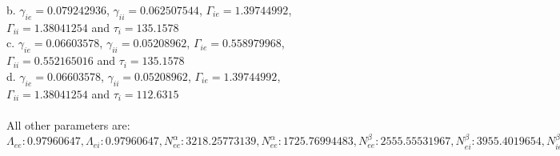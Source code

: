 \documentclass[a4paper,12pt]{article}
\begin{document}
\begin{figure}
{b. $\gamma_{ie} = 0.079242936$, $\gamma_{ii} = 0.062507544$, $\Gamma_{ie} = 1.39744992$, $\Gamma_{ii} = 1.38041254$ and $\tau_i = 135.1578$ \\
c. $\gamma_{ie} = 0.06603578$, $\gamma_{ii} = 0.05208962$, $\Gamma_{ie} = 0.558979968$, $\Gamma_{ii} = 0.552165016$ and $\tau_i = 135.1578$ \\
d. $\gamma_{ie} = 0.06603578$, $\gamma_{ii} = 0.05208962$, $\Gamma_{ie} = 1.39744992$, $\Gamma_{ii} = 1.38041254$ and $\tau_i = 112.6315$ \\
\\
All other parameters are:\\
$\Lambda_{ee}: 0.97960647, \Lambda_{ei}: 0.97960647, N^{\alpha}_{ee}: 3218.25773139, N^{\alpha}_{ee}: 1725.76994483,
N^{\beta}_{ee}: 2555.55531967, N^{\beta}_{ei}: 3955.4019654, N^{\beta}_{ie}: 558.83565101, N^{\beta}_{ii}: 805.76418084,
\Gamma_{ee}: 0.15172837, \Gamma_{ei}: 0.27123796, 
g: 0.7, \gamma_{ee}: 0.31475255879, \gamma_{ei}: 0.24594817, h^{rest}_e: -66.96584987, h^{eq}_{ee}: 0.0353266, h^{eq}_{ei}: -6.84352222,
h^{rest}_i: -77.90610838, h^{eq}_{ie}: -85.52639408, h^{eq}_{ii}: -85.434985,
\mu_e: -50.73253197, \mu_i: -51.66219544, p_{ee}: 2.1687293948, p_{ei}: 2.4342247579, p_{ie}: 0.0, p_{ii}: 0.0, \phi_{ie}: 0,
\phi_{ii}: 0, S^{max}_e: 0.101903, S^{max}_i: 0.469, \sigma_e: 6.02438944, \sigma_i: 4.21865921,
\rho_e: 2000.0, \rho_i: 2000.0, \tau_e: 139.779, \tau_i: 135.1578, \tau^{slow}: 6988.95,
  v: 0.681401$
}
\end{figure}
\end{document}
